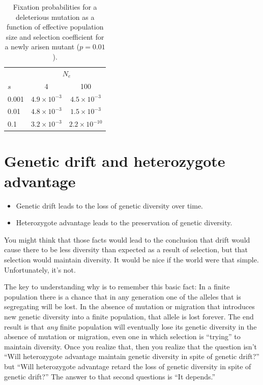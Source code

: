 \begin{table}
\begin{center}
\begin{tabular}{l|cc}
\hline\hline
      & \multicolumn{2}{c}{$N_e$} \\
$s$   & 4                  & 100 \\
\hline
0.001 & $4.9 \times 10^{-3}$ & $4.5 \times 10^{-3}$ \\
0.01  & $4.8 \times 10^{-3}$ & $1.5 \times 10^{-3}$ \\
0.1   & $3.2 \times 10^{-3}$ & $2.2 \times 10^{-10}$ \\
\hline
\end{tabular}
\end{center}
\caption{Fixation probabilities for a deleterious mutation as a
function of effective population size and selection coefficient for a
newly arisen mutant ($p=0.01$).}\label{table:fixation}
\end{table}

\section*{Genetic drift and heterozygote advantage}

\begin{itemize}

\item Genetic drift leads to the loss of genetic diversity over time. 

\item Heterozygote advantage leads to the preservation of genetic diversity.

\end{itemize}

You might think that those facts would lead to the conclusion that
drift would cause there to be less diversity than expected as a result
of selection, but that selection would maintain diversity. It would be
nice if the world were that simple. Unfortunately, it's not. 

The key to understanding why is to remember this basic fact: In a
finite population there is a chance that in any generation one of the
alleles that is segregating will be lost. In the absence of mutation
or migration that introduces new genetic diversity into a finite
population, that allele is lost forever. The end result is that {\it
  any\/} finite population will eventually lose its genetic diversity
in the absence of mutation or migration, even one in which selection
is ``trying'' to maintain diversity. Once you realize that, then you
realize that the question isn't ``Will heterozygote advantage maintain
genetic diversity in spite of genetic drift?'' but ``Will heterozygote
advantage retard the loss of genetic diversity in spite of genetic
drift?'' The answer to that second questions is ``It depends.''

